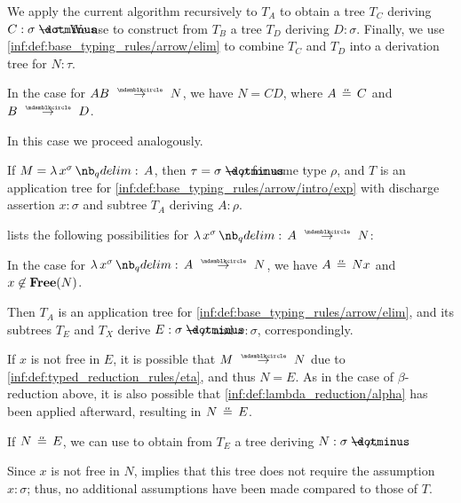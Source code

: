 \begin{algorithm}
\begin{thmenum}
\begin{thmenum}
      We apply the current algorithm recursively to \( T_A \) to obtain a tree \( T_C \) deriving \( C: \sigma \synimplies \tau \). We use  to construct from \( T_B \) a tree \( T_D \) deriving \( D: \sigma \). Finally, we use \ref{inf:def:base_typing_rules/arrow/elim} to combine \( T_C \) and \( T_D \) into a derivation tree for \( N: \tau \).

       In the case  for \( A B \pred N \), we have \( N = CD \), where \( A \aequiv C \) and \( B \pred D \).

      In this case we proceed analogously.
    \end{thmenum}

     If \( M = \qabs {x^\sigma} A \), then \( \tau = \sigma \synimplies \rho \) for some type \( \rho \), and \( T \) is an application tree for \ref{inf:def:base_typing_rules/arrow/intro/exp} with discharge assertion \( x: \sigma \) and subtree \( T_A \) deriving \( A: \rho \).

     lists the following possibilities for \( \qabs {x^\sigma} A \pred N \):
    \begin{thmenum}
       In the case  for \( \qabs {x^\sigma} A \pred N \), we have \( A \aequiv Nx \) and \( x \not\in \op*{Free}(N) \).

      Then \( T_A \) is an application tree for \ref{inf:def:base_typing_rules/arrow/elim}, and its subtrees \( T_E \) and \( T_X \) derive \( E: \sigma \synimplies \rho \) and \( x: \sigma \), correspondingly.

      If \( x \) is not free in \( E \), it is possible that \( M \pred N \) due to \ref{inf:def:typed_reduction_rules/eta}, and thus \( N = E \). As in the case of \( \beta \)-reduction above, it is also possible that \ref{inf:def:lambda_reduction/alpha} has been applied afterward, resulting in \( N \aequiv E \).

      If \( N \aequiv E \), we can use  to obtain from \( T_E \) a tree deriving \( N: \sigma \synimplies \rho \).

      Since \( x \) is not free in \( N \),  implies that this tree does not require the assumption \( x: \sigma \); thus, no additional assumptions have been made compared to those of \( T \).


\end{thmenum}
\end{thmenum}
\end{algorithm}
